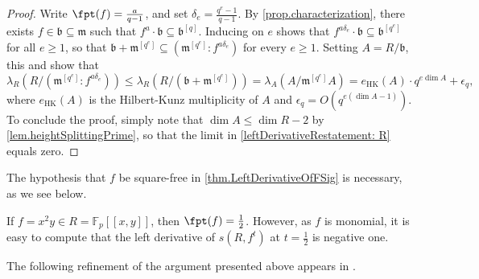 \documentclass[11pt]{amsart}
\begin{document}
\begin{proof}  Write $\fpt(f) = \frac{a}{q-1}$, and set $\delta_e = \frac{q^e-1}{q-1}$.  By \autoref{prop.characterization}, there exists $f \in {\mathfrak{b}} \subseteq {\mathfrak{m}}$ such that $f^a \cdot {\mathfrak{b}} \subseteq {\mathfrak{b}}^{[q]}$.  Inducing on $e$ shows that $f^{a \delta_e} \cdot {\mathfrak{b}} \subseteq {\mathfrak{b}}^{[q^e]}$ for all $e \geq 1$, so that ${\mathfrak{b}} + {\mathfrak{m}}^{[q^e]} \subseteq ({\mathfrak{m}}^{[q^e]} : f^{a \delta_e})$ for every $e \geq 1$.  Setting $A = R/{\mathfrak{b}}$, this and \cite{MonskyHKFunction} show that  \[ \lambda_R  ( R / ({\mathfrak{m}}^{[q^e]} : f^{a \delta_e}) ) \leq \lambda_R ( R / ({\mathfrak{b}} + {\mathfrak{m}}^{[q^e]}) ) = \lambda_A ( A / {\mathfrak{m}}^{[q^e]} A) = e_{\operatorname{HK}}(A) \cdot q^{e \dim A} + \epsilon_q, \] where $e_{\operatorname{HK}}(A)$ is the Hilbert-Kunz multiplicity of $A$ and $\epsilon_q = O(q^{e (\dim A -1)})$.   To conclude the proof, simply note that  $\dim A \leq \dim R - 2$ by \autoref{lem.heightSplittingPrime}, so that the limit in  \autoref{leftDerivativeRestatement: R} equals zero.
\end{proof}

The hypothesis that $f$ be square-free in \autoref{thm.LeftDerivativeOfFSig} is necessary, as we see below.

\begin{example}
If $f = x^2 y \in R= \mathbb{F}_p[[x,y]]$, then $\fpt(f) = \frac{1}{2}$.  However, as $f$ is monomial, it is easy to compute that the left derivative of $s(R, f^t)$ at $t=\frac{1}{2}$ is negative one.
\end{example}

The following refinement of the argument presented above appears in \cite{CantonLeftDerivativeOfFSignature}.
\end{document}
